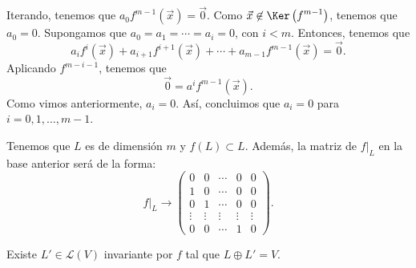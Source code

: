 Iterando, tenemos que $\displaystyle a_{0}f^{m - 1}\left(\vec{x}\right) = \vec{0} $. Como $\displaystyle \vec{x} \not\in \Ker\left(f^{m -1}\right) $, tenemos que $\displaystyle a_{0} = 0 $. Supongamos que $\displaystyle a_{0} = a_{1} = \cdots = a_{i} = 0$, con $\displaystyle i < m $. Entonces, tenemos que 
\[ a_{i}f^{i}\left(\vec{x}\right) + a_{i+1}f^{i+1}\left(\vec{x}\right) + \cdots + a_{m -1}f^{m -1}\left(\vec{x}\right) = \vec{0} .\]
Aplicando $\displaystyle f^{m -i-1} $, tenemos que
\[\vec{0} = a^{i}f^{m -1}\left(\vec{x}\right)  .\]
Como vimos anteriormente, $\displaystyle a_{i} = 0 $. Así, concluimos que $\displaystyle a_{i} = 0 $ para $\displaystyle i = 0, 1, \ldots, m -1 $. 
\begin{observation}
\normalfont Tenemos que $\displaystyle L $ es de dimensión $\displaystyle m $ y $\displaystyle f\left(L\right) \subset L $. Además, la matriz de $\displaystyle f|_{L} $ en la base anterior será de la forma:
\[ f|_{L} \to \begin{pmatrix} 0 & 0  & \cdots &0 & 0\\
	1 & 0  & \cdots & 0 & 0 \\
0 & 1  & \cdots & 0 & 0 \\
\vdots & \vdots  & \vdots & \vdots & \vdots \\
0 & 0 & \cdots & 1 & 0 \end{pmatrix} .\]
\end{observation}
\begin{ftheorem}[]
\normalfont Existe $\displaystyle L'\in \mathcal{L}\left(V\right) $ invariante por $\displaystyle f $ tal que $\displaystyle L\oplus L' = V $.
\end{ftheorem}
